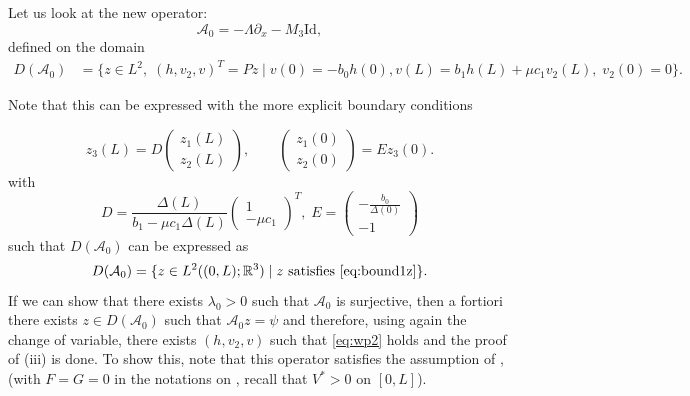 \documentclass[11pt]{article}
\begin{document}
Let us look at the new operator:
\begin{equation}
    \mathcal{A}_{0} = -\Lambda \partial_{x} -M_{3} \text{Id},
\end{equation}
defined on the domain
    \begin{equation} 
    \begin{split}
    D(\mathcal{A}_{0}) &= \{z \in L^{2}, \; (h,v_{2},v)^{T} = Pz \;|\;v(0) = -b_{0}h(0),  v(L) = b_{1}h(L)+\mu c_{1}v_{2}(L),\; v_{2}(0) = 0\}.
    \end{split}
    \end{equation}

    Note that this can be expressed with the more explicit boundary conditions

\begin{equation}
\label{eq:bound1z}
    z_{3}(L) = D\begin{pmatrix}z_{1}(L) \\z_{2}(L)\end{pmatrix}, \qquad
    \begin{pmatrix}z_{1}(0) \\z_{2}(0)\end{pmatrix} = Ez_{3}(0).
\end{equation}
with
\begin{equation}
\label{eq:bound2z}
    D = \displaystyle \frac{\Delta(L)}{b_1 -\mu c_1 \Delta(L)} \begin{pmatrix}
        1 \\ - \mu c_1
    \end{pmatrix}^T, \; E = \begin{pmatrix} \displaystyle
        - \frac{b_0}{\Delta(0)} \\ -1
    \end{pmatrix}
\end{equation}
such that $D(\mathcal{A}_{0})$ can be expressed as
\begin{equation}
    D(\mathcal{A}_{0})=\{z\in L^{2}((0,L);\mathbb{R}^{3})\;|\; z \text{ satisfies }\eqref{eq:bound1z}\}.
\end{equation}
If we can show that there exists $\lambda_{0}>0$ such that $\mathcal{A}_{0}$ is surjective, then a fortiori there exists $z\in D(\mathcal{A}_{0})$ such that $\mathcal{A}_{0}z = {{\psi}}$ and therefore, using again the change of variable, there exists $(h,v_{2},v)$ such that \eqref{eq:wp2} holds and the proof of (iii) is done. To show this, note that this operator satisfies the assumption of \cite{lichtner2008spectral}, (with $F=G=0$ in the notations on \cite{lichtner2008spectral}, {recall that $V^{*}>0$ on $[0,L]$}).
\end{document}
